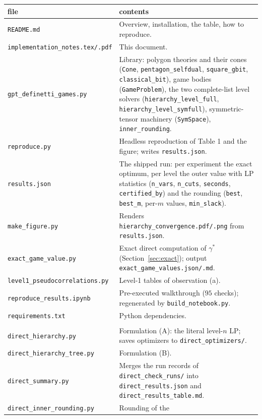 \documentclass[11pt,a4paper]{article}
\newcommand*{\code}[1]{\texttt{#1}}
\theoremstyle{remark}
\begin{document}
\begin{center}\small
\begin{tabular}{>{\raggedright\arraybackslash}p{52mm}>{\raggedright\arraybackslash}p{90mm}}
\toprule
file & contents\\
\midrule
\code{README.md} & Overview, installation, the table, how to reproduce.\\
\code{implementation\_notes.tex/.pdf} & This document.\\
\code{gpt\_definetti\_games.py} & Library: polygon theories and their
cones (\code{Cone}, \code{pentagon\_selfdual}, \code{square\_gbit},
\code{classical\_bit}), game bodies (\code{GameProblem}), the two
complete-list level solvers (\code{hierarchy\_level\_full},
\code{hierarchy\_level\_symfull}), symmetric-tensor machinery
(\code{SymSpace}), \code{inner\_rounding}.\\
\code{reproduce.py} & Headless reproduction of Table 1 and the figure;
writes \code{results.json}.\\
\code{results.json} & The shipped run: per experiment the exact optimum,
per level the outer value with LP statistics (\code{n\_vars},
\code{n\_cuts}, \code{seconds}, \code{certified\_by}) and the rounding
(\code{best}, \code{best\_m}, per-$m$ values, \code{min\_slack}).\\
\code{make\_figure.py} & Renders \code{hierarchy\_convergence.pdf/.png}
from \code{results.json}.\\
\code{exact\_game\_value.py} & Exact direct computation of $\gamma^*$
(Section~\ref{sec:exact}); output \code{exact\_game\_values.json/.md}.\\
\code{level1\_pseudocorrelations.py} & Level-1 tables of observation (a).\\
\code{reproduce\_results.ipynb} & Pre-executed walkthrough ($95$ checks);
regenerated by \code{build\_notebook.py}.\\
\code{requirements.txt} & Python dependencies.\\
\midrule
\multicolumn{2}{l}{\emph{folder} \code{unreduced\_checks/}}\\
\code{direct\_hierarchy.py} & Formulation (A): the
literal level-$n$ LP; saves optimizers to \code{direct\_optimizers/}.\\
\code{direct\_hierarchy\_tree.py} & Formulation (B).\\
\code{direct\_summary.py} & Merges the run records of
\code{direct\_check\_runs/} into \code{direct\_results.json} and
\code{direct\_results\_table.md}.\\
\code{direct\_inner\_rounding.py} & Rounding of the

\end{tabular}
\end{center}
\end{document}
